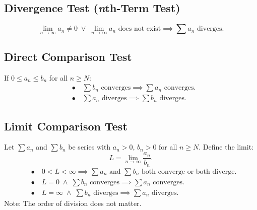 \documentclass[a4paper,11pt]{article}
\begin{document}


\subsection{Divergence Test (\emph{n}th-Term Test)}

\begin{tcolorbox}
    \[
    \lim_{n \to \infty} a_n \neq 0 \; \lor \; \lim_{n \to \infty} a_n \text{ does not exist} \implies \sum a_n \text{ diverges}.
    \]
\end{tcolorbox}




\subsection{Direct Comparison Test}

\begin{tcolorbox}
    If $0 \leq a_n \leq b_n$ for all $n \geq N$:
    \[
    \begin{aligned}
        &\bullet \quad \sum b_n \text{ converges} \implies \sum a_n \text{ converges}. \\[8pt]  
        &\bullet \quad \sum a_n \text{ diverges} \implies \sum b_n \text{ diverges}.
    \end{aligned}
    \]
\end{tcolorbox}




\subsection{Limit Comparison Test}

\begin{tcolorbox}
    Let $\textstyle \sum a_n$ and $\textstyle \sum b_n$ be series with $a_n > 0,\, b_n > 0$ for all $n \geq N$. Define the limit:
    \[
    L = \lim_{n \to \infty} \frac{a_n}{b_n}.
    \]
    \[
    \begin{aligned}
        &\bullet \quad 0 < L < \infty \implies \sum a_n \text{ and } \sum b_n \text{ both converge or both diverge}. \\[8pt]  
        &\bullet \quad L = 0 \; \land \; \sum b_n \text{ converges} \implies \sum a_n \text{ converges}. \\[8pt]
        &\bullet \quad L = \infty \; \land \; \sum b_n \text{ diverges} \implies \sum a_n \text{ diverges}.
    \end{aligned}
    \]
    Note: The order of division does not matter.
\end{tcolorbox}
\end{document}
